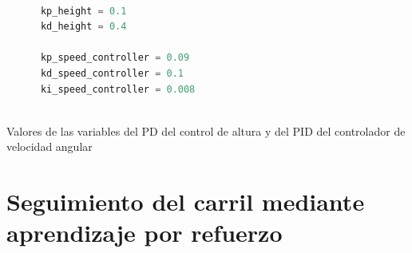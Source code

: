   \begin{code}[h]
    \begin{lstlisting}[language=Python]

      kp_height = 0.1
      kd_height = 0.4

      kp_speed_controller = 0.09
      kd_speed_controller = 0.1
      ki_speed_controller = 0.008
     
    \end{lstlisting}
    \caption[Valores de las variables del PD del control de altura y del PID del controlador de velocidad angular]{Valores de las variables del PD del control de altura y del PID del controlador de velocidad angular}
    \label{cod:codejemplo}
    \end{code} 

  \section{Seguimiento del carril mediante aprendizaje por refuerzo}
  \label{sec:Reinforcement learning}

